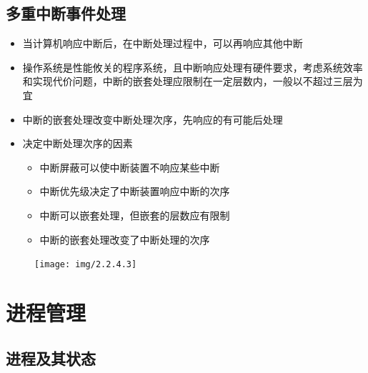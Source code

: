 \documentclass[cs4size,a4paper,10pt]{ctexart}
\begin{document}
	\subsection{多重中断事件处理}
	\begin{itemize}
		\item 当计算机响应中断后，在中断处理过程中，可以再响应其他中断
		\item 操作系统是性能攸关的程序系统，且中断响应处理有硬件要求，考虑系统效率和实现代价问题，中断的嵌套处理应限制在一定层数内，一般以不超过三层为宜
		\item 中断的嵌套处理改变中断处理次序，先响应的有可能后处理
		\item 决定中断处理次序的因素
		\begin{itemize}
			\item 中断屏蔽可以使中断装置不响应某些中断
			\item 中断优先级决定了中断装置响应中断的次序
			\item 中断可以嵌套处理，但嵌套的层数应有限制
			\item 中断的嵌套处理改变了中断处理的次序
		\end{itemize}
	\end{itemize}
	\begin{figure}[H]
		\centering
		\texttt{[image: img/2.2.4.3]}
	\end{figure}


	\section{进程管理}
	\subsection{进程及其状态}
\end{document}
